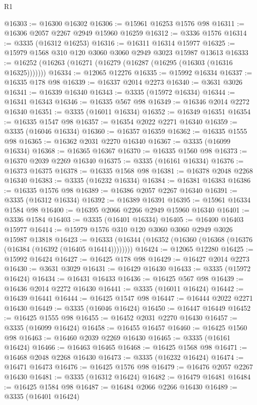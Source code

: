 \begin{lexlean}{R1}
\begin{coremodule}
@16303 := @16300 @16302
@16306 := @15961 @16253 @1576 @98
@16311 := @16306 @2057 @2267 @2949 @15960 @16259
@16312 := @3336 @1576
@16314 := @3335 (@16312 @16253)
@16316 := @16311 @16314 @15977
@16325 := @15979 @1568 @310 @120 @3060 @3060 @2949 @3023 @15987 @13613
@16333 := @16252 (@16263 (@16271 (@16279 (@16287 (@16295 (@16303 (@16316 @16325)))))))
@16334 := @12065 @12276
@16335 := @15992 @16334
@16337 := @16335 @178 @98
@16339 := @16337 @2014 @2273
@16340 := @3631 @3026
@16341 := @16339 @16340
@16343 := @3335 (@15972 @16334)
@16344 := @16341 @16343
@16346 := @16335 @567 @98
@16349 := @16346 @2014 @2272 @16340
@16351 := @3335 (@16011 @16334)
@16352 := @16349 @16351
@16354 := @16335 @1547 @98
@16357 := @16354 @2022 @2271 @16340
@16359 := @3335 (@16046 @16334)
@16360 := @16357 @16359
@16362 := @16335 @1555 @98
@16365 := @16362 @2031 @2270 @16340
@16367 := @3335 (@16099 @16334)
@16368 := @16365 @16367
@16370 := @16335 @1560 @98
@16373 := @16370 @2039 @2269 @16340
@16375 := @3335 (@16161 @16334)
@16376 := @16373 @16375
@16378 := @16335 @1568 @98
@16381 := @16378 @2048 @2268 @16340
@16383 := @3335 (@16232 @16334)
@16384 := @16381 @16383
@16386 := @16335 @1576 @98
@16389 := @16386 @2057 @2267 @16340
@16391 := @3335 (@16312 @16334)
@16392 := @16389 @16391
@16395 := @15961 @16334 @1584 @98
@16400 := @16395 @2066 @2266 @2949 @15960 @16340
@16401 := @3336 @1584
@16403 := @3335 (@16401 @16334)
@16405 := @16400 @16403 @15977
@16414 := @15979 @1576 @310 @120 @3060 @3060 @2949 @3026 @15987 @13818
@16423 := @16333 (@16344 (@16352 (@16360 (@16368 (@16376 (@16384 (@16392 (@16405 @16414))))))))
@16424 := @12065 @12280
@16425 := @15992 @16424
@16427 := @16425 @178 @98
@16429 := @16427 @2014 @2273
@16430 := @3631 @3029
@16431 := @16429 @16430
@16433 := @3335 (@15972 @16424)
@16434 := @16431 @16433
@16436 := @16425 @567 @98
@16439 := @16436 @2014 @2272 @16430
@16441 := @3335 (@16011 @16424)
@16442 := @16439 @16441
@16444 := @16425 @1547 @98
@16447 := @16444 @2022 @2271 @16430
@16449 := @3335 (@16046 @16424)
@16450 := @16447 @16449
@16452 := @16425 @1555 @98
@16455 := @16452 @2031 @2270 @16430
@16457 := @3335 (@16099 @16424)
@16458 := @16455 @16457
@16460 := @16425 @1560 @98
@16463 := @16460 @2039 @2269 @16430
@16465 := @3335 (@16161 @16424)
@16466 := @16463 @16465
@16468 := @16425 @1568 @98
@16471 := @16468 @2048 @2268 @16430
@16473 := @3335 (@16232 @16424)
@16474 := @16471 @16473
@16476 := @16425 @1576 @98
@16479 := @16476 @2057 @2267 @16430
@16481 := @3335 (@16312 @16424)
@16482 := @16479 @16481
@16484 := @16425 @1584 @98
@16487 := @16484 @2066 @2266 @16430
@16489 := @3335 (@16401 @16424)

\end{coremodule}
\end{lexlean}
